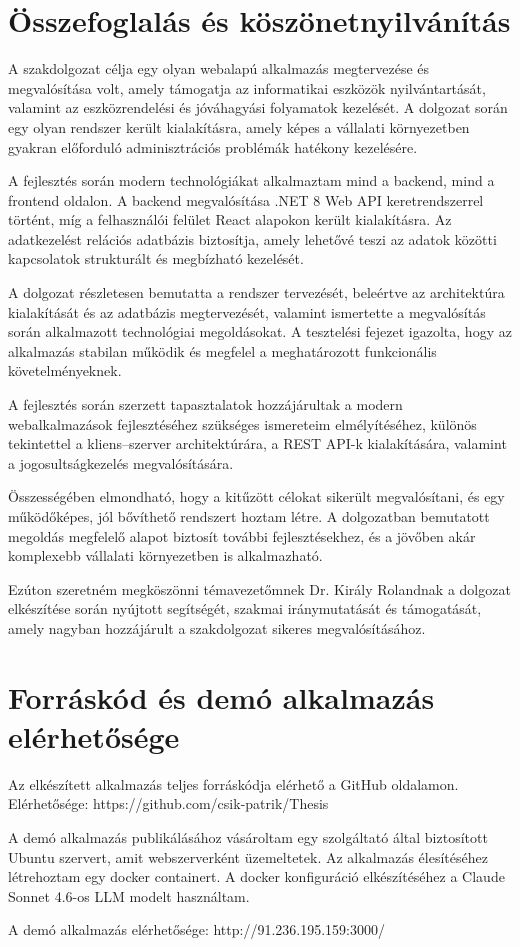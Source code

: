 \documentclass[
]{thesis-ekf}
\theoremstyle{definition}
\theoremstyle{remark}
\begin{document}
\chapter{Összefoglalás és köszönetnyilvánítás}

A szakdolgozat célja egy olyan webalapú alkalmazás megtervezése és megvalósítása volt, amely támogatja az informatikai eszközök nyilvántartását, valamint az eszközrendelési és jóváhagyási folyamatok kezelését. A dolgozat során egy olyan rendszer került kialakításra, amely képes a vállalati környezetben gyakran előforduló adminisztrációs problémák hatékony kezelésére.

A fejlesztés során modern technológiákat alkalmaztam mind a backend, mind a frontend oldalon. A backend megvalósítása .NET 8 Web API keretrendszerrel történt, míg a felhasználói felület React alapokon került kialakításra. Az adatkezelést relációs adatbázis biztosítja, amely lehetővé teszi az adatok közötti kapcsolatok strukturált és megbízható kezelését.

A dolgozat részletesen bemutatta a rendszer tervezését, beleértve az architektúra kialakítását és az adatbázis megtervezését, valamint ismertette a megvalósítás során alkalmazott technológiai megoldásokat. A tesztelési fejezet igazolta, hogy az alkalmazás stabilan működik és megfelel a meghatározott funkcionális követelményeknek.

A fejlesztés során szerzett tapasztalatok hozzájárultak a modern webalkalmazások fejlesztéséhez szükséges ismereteim elmélyítéséhez, különös tekintettel a kliens–szerver architektúrára, a REST API-k kialakítására, valamint a jogosultságkezelés megvalósítására.

Összességében elmondható, hogy a kitűzött célokat sikerült megvalósítani, és egy működőképes, jól bővíthető rendszert hoztam létre. A dolgozatban bemutatott megoldás megfelelő alapot biztosít további fejlesztésekhez, és a jövőben akár komplexebb vállalati környezetben is alkalmazható.

Ezúton szeretném megköszönni témavezetőmnek Dr. Király Rolandnak a dolgozat elkészítése során nyújtott segítségét, szakmai iránymutatását és támogatását, amely nagyban hozzájárult a szakdolgozat sikeres megvalósításához.

\chapter{Forráskód és demó alkalmazás elérhetősége}

Az elkészített alkalmazás teljes forráskódja elérhető a GitHub oldalamon.
Elérhetősége: https://github.com/csik-patrik/Thesis

A demó alkalmazás publikálásához vásároltam egy szolgáltató által biztosított Ubuntu szervert, amit webszerverként üzemeltetek.
Az alkalmazás élesítéséhez létrehoztam egy docker containert. A docker konfiguráció elkészítéséhez a Claude Sonnet 4.6-os LLM modelt használtam.

A demó alkalmazás elérhetősége: http://91.236.195.159:3000/

\printbibliography
\nocite{*}


\end{document}
